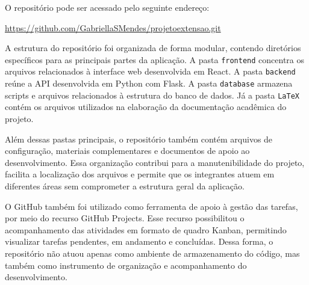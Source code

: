 O repositório pode ser acessado pelo seguinte endereço:

\begin{center}
\url{https://github.com/GabriellaSMendes/projetoextensao.git}
\end{center}

A estrutura do repositório foi organizada de forma modular, contendo diretórios específicos para as principais partes da aplicação. A pasta \texttt{frontend} concentra os arquivos relacionados à interface web desenvolvida em React. A pasta \texttt{backend} reúne a API desenvolvida em Python com Flask. A pasta \texttt{database} armazena scripts e arquivos relacionados à estrutura do banco de dados. Já a pasta \texttt{LaTeX} contém os arquivos utilizados na elaboração da documentação acadêmica do projeto.

Além dessas pastas principais, o repositório também contém arquivos de configuração, materiais complementares e documentos de apoio ao desenvolvimento. Essa organização contribui para a manutenibilidade do projeto, facilita a localização dos arquivos e permite que os integrantes atuem em diferentes áreas sem comprometer a estrutura geral da aplicação.

O GitHub também foi utilizado como ferramenta de apoio à gestão das tarefas, por meio do recurso GitHub Projects. Esse recurso possibilitou o acompanhamento das atividades em formato de quadro Kanban, permitindo visualizar tarefas pendentes, em andamento e concluídas. Dessa forma, o repositório não atuou apenas como ambiente de armazenamento do código, mas também como instrumento de organização e acompanhamento do desenvolvimento.